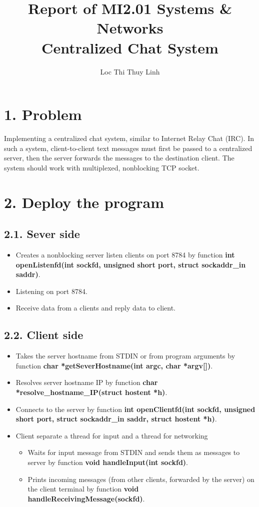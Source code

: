 \documentclass[11pt, oneside]{article}
\title{Report of MI2.01 Systems \& Networks\\
\vskip 1cm
Centralized Chat System}
\author{Loc Thi Thuy Linh}
\begin{document}
\maketitle

\section*{1. Problem}
Implementing a centralized chat system, similar to Internet Relay Chat (IRC). In such a system, client-to-client text messages must first be passed to a centralized server, then the server forwards the messages to the destination client. The system should work with multiplexed, nonblocking TCP socket.

\section*{2. Deploy the program}
\subsection*{2.1. Sever side} 
 	\begin{itemize}
	\item Creates a nonblocking server listen clients on port 8784 by function \textbf{int openListenfd(int sockfd, unsigned short port, struct sockaddr\_in saddr)}.
	\item Listening on port 8784.
	\item Receive data from a clients and reply data to client.
	\end{itemize}
\subsection*{2.2. Client side} 
 	\begin{itemize}
	\item Takes the server hostname from STDIN or from program arguments by function \textbf{char *getSeverHostname(int argc, char *argv[])}.
	\item Resolves server hostname IP by function \textbf{char *resolve\_hostname\_IP(struct hostent *h)}.
	\item Connects to the server by function \textbf{int openClientfd(int sockfd, unsigned short port, struct sockaddr\_in saddr, struct hostent *h)}.
	\item Client separate a thread for input and a thread for networking
		\begin{itemize}
			\item Waits for input message from STDIN and sends them as messages to server by function \textbf{void handleInput(int sockfd)}.
			\item Prints incoming messages (from other clients, forwarded by the server) on the client terminal by function \textbf{void handleReceivingMessage(sockfd)}.
		\end{itemize}
	\end{itemize}
\end{document}
